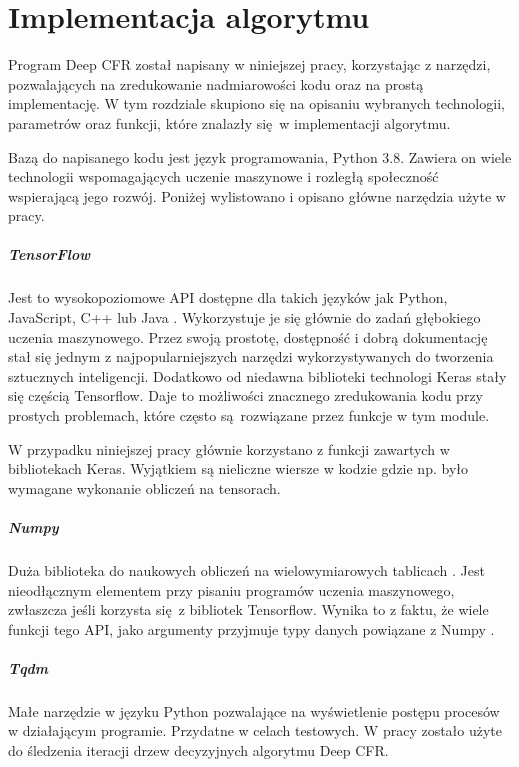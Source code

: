 \documentclass[12pt,oneside,a4paper]{report}
\begin{document}
\chapter{Implementacja algorytmu} 

Program Deep CFR został napisany w niniejszej pracy, korzystając z narzędzi,
pozwalających na zredukowanie nadmiarowości kodu oraz na prostą implementację.
W tym rozdziale skupiono się na opisaniu wybranych technologii, parametrów oraz funkcji, 
które znalazły się w implementacji algorytmu.

Bazą do napisanego kodu jest język programowania, Python 3.8. Zawiera on wiele
technologii wspomagających uczenie maszynowe i rozległą społeczność wspierającą jego rozwój.
Poniżej 
wylistowano i opisano główne narzędzia użyte w pracy.

\paragraph{TensorFlow}

Jest to wysokopoziomowe API dostępne dla takich języków jak Python, JavaScript, C++ lub Java
\cite{tensorflow}.
Wykorzystuje je się głównie do zadań głębokiego uczenia maszynowego. Przez swoją prostotę, dostępność 
i dobrą
dokumentację stał się jednym z najpopularniejszych narzędzi wykorzystywanych do tworzenia
sztucznych inteligencji. Dodatkowo od niedawna biblioteki technologi Keras stały się częścią Tensorflow.
Daje to możliwości znacznego
zredukowania kodu przy prostych problemach, które często są rozwiązane przez funkcje w tym module. 


W przypadku niniejszej pracy głównie korzystano z funkcji zawartych w bibliotekach Keras. Wyjątkiem 
są nieliczne wiersze w kodzie gdzie np. było wymagane wykonanie obliczeń na tensorach.

\paragraph{Numpy}

Duża biblioteka do naukowych obliczeń na wielowymiarowych tablicach \cite{numpy}. Jest nieodłącznym
elementem przy pisaniu programów uczenia maszynowego, zwłaszcza jeśli korzysta się z 
bibliotek Tensorflow. Wynika to z faktu, że wiele funkcji tego API, jako argumenty przyjmuje
typy danych powiązane z Numpy \cite{tensorflow}.



\paragraph{Tqdm}
Małe narzędzie w języku Python pozwalające na wyświetlenie postępu procesów w działającym 
programie.
Przydatne w celach
testowych. W pracy zostało użyte do śledzenia iteracji drzew decyzyjnych 
algorytmu Deep CFR.
\end{document}
